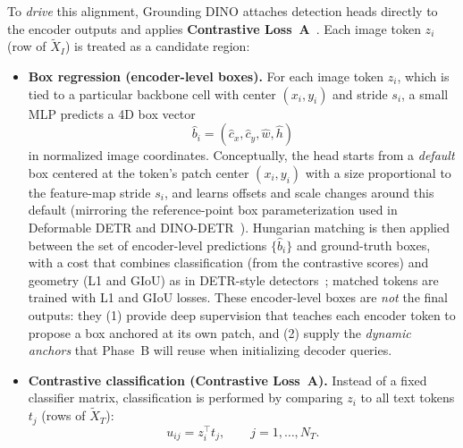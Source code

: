 \begin{enrichment}
\begin{enrichment}[Method][subsection]
		To \emph{drive} this alignment, Grounding DINO attaches detection heads directly to the encoder outputs and applies \textbf{Contrastive Loss~A}~\cite{liu2023_groundingdino,li2022_glip}. Each image token \(z_i\) (row of \(\tilde{X}_I\)) is treated as a candidate region:
		\begin{itemize}
			\item \textbf{Box regression (encoder-level boxes).}  
			For each image token \(z_i\), which is tied to a particular backbone cell with center \((x_i,y_i)\) and stride \(s_i\), a small MLP predicts a 4D box vector
			\[
			\hat{b}_i = (\hat{c}_x,\hat{c}_y,\hat{w},\hat{h})
			\]
			in normalized image coordinates. Conceptually, the head starts from a \emph{default} box centered at the token’s patch center \((x_i,y_i)\) with a size proportional to the feature-map stride \(s_i\), and learns offsets and scale changes around this default (mirroring the reference-point box parameterization used in Deformable DETR and DINO-DETR~\cite{zhu2021_deformabledetr,zhang2022_dino}). Hungarian matching is then applied between the set of encoder-level predictions \(\{\hat{b}_i\}\) and ground-truth boxes, with a cost that combines classification (from the contrastive scores) and geometry (L1 and GIoU) as in DETR-style detectors~\cite{carion2020_detr}; matched tokens are trained with L1 and GIoU losses. These encoder-level boxes are \emph{not} the final outputs: they (1) provide deep supervision that teaches each encoder token to propose a box anchored at its own patch, and (2) supply the \emph{dynamic anchors} that Phase~B will reuse when initializing decoder queries.
			
			\item \textbf{Contrastive classification (Contrastive Loss~A).}  
			Instead of a fixed classifier matrix, classification is performed by comparing \(z_i\) to all text tokens \(t_j\) (rows of \(\tilde{X}_T\)):
			\[
			u_{ij} = z_i^\top t_j,\qquad j = 1,\dots,N_T.
			\]
			
			\newpage
			

\end{itemize}
\end{enrichment}
\end{enrichment}
